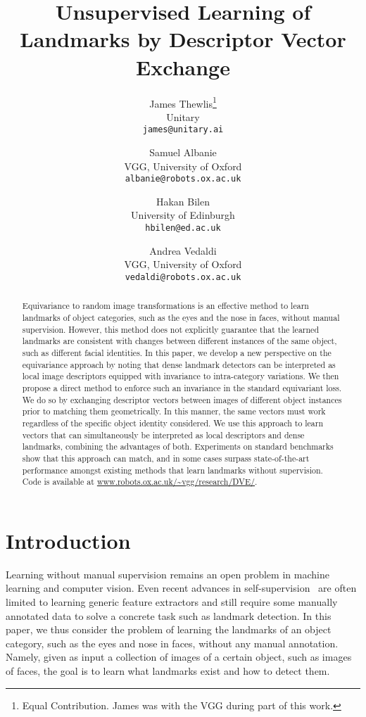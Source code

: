 \documentclass[10pt,twocolumn,letterpaper]{article}
\title{Unsupervised Learning of Landmarks by Descriptor Vector Exchange}
\author{James Thewlis\thanks{Equal Contribution. James was with the VGG during part of this work.}\\
\small Unitary\\
{\tt\footnotesize james@unitary.ai}
\and
Samuel Albanie\samethanks\\
\small VGG, University of Oxford\\
{\tt\footnotesize albanie@robots.ox.ac.uk}
\and
Hakan Bilen\\
\small University of Edinburgh\\
{\tt\footnotesize hbilen@ed.ac.uk}
\and
Andrea Vedaldi\\
\small VGG, University of Oxford\\
{\tt\footnotesize vedaldi@robots.ox.ac.uk}
}
\begin{document}
\maketitle

\begin{abstract}
Equivariance to random image transformations is an effective method to learn landmarks of object categories, such as the eyes and the nose in faces, without manual supervision.
However, this method does not explicitly guarantee that the learned landmarks are consistent with changes between different instances of the same object, such as different facial identities.
In this paper, we develop a new perspective on the equivariance approach by noting that dense landmark detectors can be interpreted as local image descriptors equipped with invariance to intra-category variations.
We then propose a direct method to enforce such an invariance in the standard equivariant loss.
We do so by exchanging descriptor vectors between images of different object instances prior to matching them geometrically.
In this manner, the same vectors must work regardless of the specific object identity considered.
We use this approach to learn vectors that can simultaneously be interpreted as local descriptors and dense landmarks, combining the advantages of both.
Experiments on standard benchmarks show that this approach can match, and in some cases surpass state-of-the-art performance
amongst existing methods that learn landmarks without supervision. Code is available at \mbox{\url{www.robots.ox.ac.uk/~vgg/research/DVE/}}.
\end{abstract}

\section{Introduction}\label{s:intro}

Learning without manual supervision remains an open problem in machine learning and computer vision.
Even recent advances in self-supervision~\cite{jenni2018self,kanezaki2018rotationnet}
are often limited to learning generic feature extractors and still require some manually annotated data to solve a concrete task such as landmark detection.
In this paper, we thus consider the problem of learning the landmarks of an object category, such as the eyes and nose in faces, without any manual annotation.
Namely, given as input a collection of images of a certain object, such as images of faces, the goal is to learn what landmarks exist and how to detect them.
\end{document}
